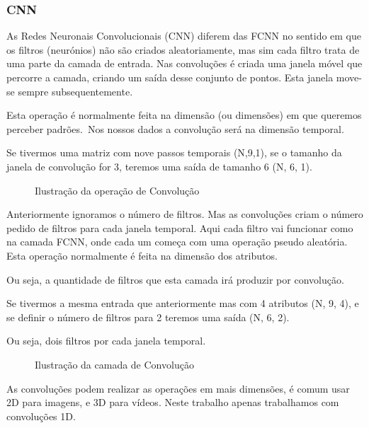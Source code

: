 \subsubsection{CNN\label{se:cnn_sec}}
As Redes Neuronais Convolucionais (\gls{CNN}) diferem das \gls{FCNN} no sentido em que os filtros (neurónios) não são criados aleatoriamente, mas sim cada filtro trata de uma parte da camada de entrada. Nas convoluções é criada uma janela móvel que percorre a camada, criando um saída desse conjunto de pontos. Esta janela move-se sempre subsequentemente.\par
Esta operação é normalmente feita na dimensão (ou dimensões) em que queremos perceber padrões.\
Nos nossos dados a convolução será na dimensão temporal.\par
Se tivermos uma matriz com nove passos temporais (N,9,1), se o tamanho da janela de convolução for 3, teremos uma saída de tamanho 6 (N, 6, 1).\par
\begin{figure}[H]
	\centering
	\resizebox{\linewidth}{!}{}
	\caption{Ilustração da operação de Convolução}
	\label{fig:conv_layer1D}
\end{figure}

Anteriormente ignoramos o número de filtros. Mas as convoluções criam o número pedido de filtros para cada janela temporal. Aqui cada filtro vai funcionar como na camada \gls{FCNN}, onde cada um começa com uma operação pseudo aleatória. Esta operação normalmente é feita na dimensão dos atributos.\par
Ou seja, a quantidade de filtros que esta camada irá produzir por convolução.\par
Se tivermos a mesma entrada que anteriormente mas com 4 atributos (N, 9, 4), e se definir o número de filtros para 2 teremos uma saída (N, 6, 2).\par
Ou seja, dois filtros por cada janela temporal.\par


\begin{figure}[H]
	\centering
	\resizebox{\linewidth}{!}{}
	\caption{Ilustração da camada de Convolução}
	\label{fig:conv_layer}
\end{figure}

As convoluções podem realizar as operações em mais dimensões, é comum usar 2D para imagens, e 3D para vídeos. Neste trabalho apenas trabalhamos com convoluções 1D.\par

